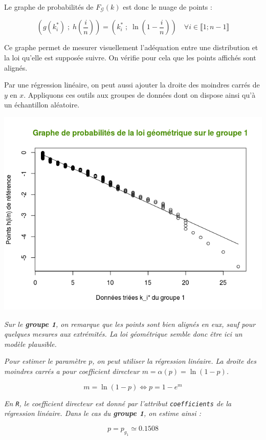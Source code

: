 \documentclass[a4paper,11pt]{article}
\theoremstyle{nonumberplain}
\theoremstyle{nonumberplain}
\theoremstyle{nonumberplain}
\theoremstyle{nonumberplain}
\begin{document}
        \medskip
        Le graphe de probabilités de $F_\mathcal{G}(k)$ est donc le nuage de points :

          \[
              \left(g(k_i^*)\;;\;h(\frac{i}{n})\right) = \left(k_i^*\;;\;\ln(1 - \frac{i}{n})\right)\quad\forall i \in \llbracket 1; n - 1 \rrbracket
          \]

        Ce graphe permet de mesurer visuellement l'adéquation entre
        une distribution et la loi qu'elle est supposée suivre. On vérifie
        pour cela que les points affichés sont alignés.

        \medskip
        Par une régression linéaire, on peut aussi ajouter la droite des moindres
        carrés de $y$ en $x$. Appliquons ces outils aux groupes de données dont
        on dispose ainsi qu'à un échantillon aléatoire.

        \begin{center}
            \includegraphics[scale=0.75]{images/p1_q3_groupe1.png}
        \end{center}

        \vspace{-2ex}
        \begin{commentaire}
            \hspace{-1ex}\emph{Sur le \textbf{groupe 1}, on remarque que les points sont bien alignés en eux, sauf
            pour quelques mesures aux extrémités. La loi géométrique semble donc être ici un modèle plausible.}

            \medskip
            \emph{Pour estimer le paramètre $p$, on peut utiliser la régression linéaire. La droite des moindres
            carrés a pour coefficient directeur $m = \alpha(p) = \ln(1 - p)$.}

            \[
                m = \ln(1 - p) \iff p = 1 - e^m
            \]

            \emph{En \texttt{R}, le coefficient directeur est donné par l'attribut \texttt{coefficients}
            de la régression linéaire. Dans le cas du \textbf{groupe 1}, on estime ainsi :}

            \[
                p = p_{g_1} \simeq 0.1508
            \]
        \end{commentaire}
\end{document}
